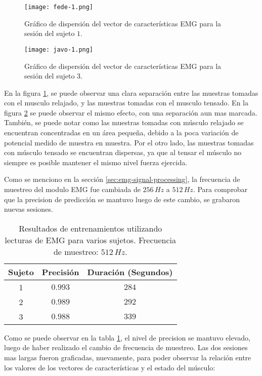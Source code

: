  \begin{figure}[H]
	\centering
    \texttt{[image: fede-1.png]}
    \caption{Gráfico de dispersión del vector de características EMG para la sesión del sujeto $1$.}
	\label{fig:emg-graph-s1}
\end{figure}

 \begin{figure}[H]
	\centering
    \texttt{[image: javo-1.png]}
    \caption{Gráfico de dispersión del vector de características EMG para la sesión del sujeto $3$.}
	\label{fig:emg-graph-s3}
\end{figure}

En la figura \ref{fig:emg-graph-s1}, se puede observar una clara separación entre las muestras tomadas con el musculo relajado, y las muestras tomadas con el musculo tensado. En la figura \ref{fig:emg-graph-s3} se puede observar el mismo efecto, con una separación aun mas marcada. También, se puede notar como las muestras tomadas con músculo relajado se encuentran concentradas en un área pequeña, debido a la poca variación de potencial medido de muestra en muestra. Por el otro lado, las muestras tomadas con músculo tensado se encuentran dispersas, ya que al tensar el músculo no siempre es posible mantener el mismo nivel fuerza ejercida.

Como se menciono en la sección \ref{sec:emg-signal-processing}, la frecuencia de muestreo del modulo EMG fue cambiada de $256\,Hz$ a $512\,Hz$. Para comprobar que la precision de predicción se mantuvo luego de este cambio, se grabaron nuevas sesiones.

\begin{table}[H]
\centering
\begin{tabular}{ |c|c|c| } 
 \hline
 Sujeto & Precisión & Duración (Segundos) \\ 
 \hline
 1 & $0.993$ & $284$ \\
 \hline
 2 & $0.989$ & $292$ \\
 \hline
 3 & $0.988$ & $339$ \\

 \hline
\end{tabular}
\caption{Resultados de entrenamientos utilizando lecturas de EMG para varios sujetos. Frecuencia de muestreo: $512\,Hz$.}
\label{tab:emg-results-512}
\end{table}

Como se puede observar en la tabla \ref{tab:emg-results-512}, el nivel de precision se mantuvo elevado, luego de haber realizado el cambio de frecuencia de muestreo. Las dos sesiones mas largas fueron graficadas, nuevamente, para poder observar la relación entre los valores de los vectores de características y el estado del músculo:


